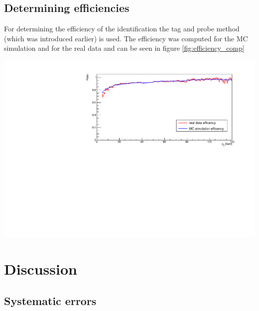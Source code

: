\documentclass[12pt, a4paper, bibliography=totoc]{scrartcl}
\begin{document}
\begin{multicols}{2}
\subsection{Determining efficiencies}
For determining the efficiency of the identification the tag and probe method (which was introduced earlier) is used.
The efficiency was computed for the MC simulation and for the real data and can be seen in figure \ref{fig:efficiency_comp}

\begin{center}
    \includegraphics[width=\linewidth]{fig/efficency_comparison.pdf}
    \label{fig:efficiency_comp}
\end{center}


\section{Discussion}

\subsection{Systematic errors}

\nocite{*}
\appendix
\printbibliography
\end{multicols}
\end{document}
